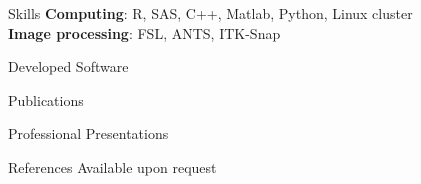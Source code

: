 \documentclass{resume} %
\begin{document}

\begin{rSection}{Skills}
\textbf{Computing}: R, SAS, C++, Matlab, Python, Linux cluster \\
\textbf{Image processing}: FSL, ANTS, ITK-Snap
\end{rSection}


\begin{rSection}{Developed Software}

\begin{refsection}
\nocite{*}
\leavevmode\printbibliography[omitnumbers=true,heading=none]
\end{refsection}

\end{rSection}

\begin{rSection}{Publications}

\begin{refsection}[CV.bib]
\nocite{*}
\printbibliography[keyword=Published,omitnumbers=true,title=Published]
\printbibliography[keyword=In Progress,omitnumbers=true,title=In Progress]
\end{refsection}

\end{rSection}



\begin{rSection}{Professional Presentations}

\begin{refsection}
\nocite{*}
\leavevmode\printbibliography[omitnumbers=true,heading=none]
\end{refsection}

\end{rSection}

\begin{rSection}{References}
Available upon request
\end{rSection}
\end{document}
